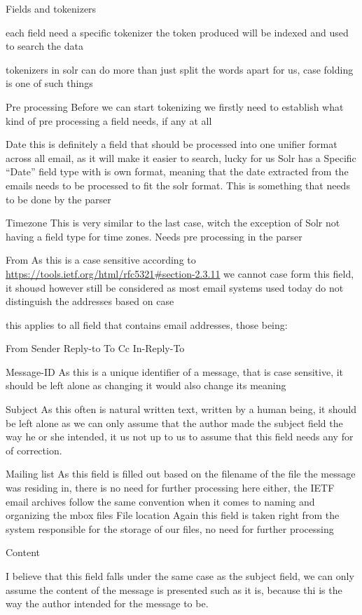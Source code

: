 \documentclass{report}
\begin{document}
Fields and tokenizers

each field need a specific tokenizer
the token produced will be indexed and used to search the data

tokenizers in solr can do more than just split the words apart for us, case folding is one of such things

Pre processing
Before we can start tokenizing we firstly need to establish what kind of pre processing a field needs, if any at all

Date
this is definitely a field that should be processed into one unifier format across all email, as it will make it easier to search, lucky for us Solr has a Specific “Date” field type with is own format, meaning that the date extracted from the emails needs to be processed to fit the solr format. This is something that needs to be done by the parser

Timezone
This is very similar to the last case, witch the exception of Solr not having a field type for time zones. Needs pre processing in the parser

From
As this is a case sensitive according to 
\url{https://tools.ietf.org/html/rfc5321#section-2.3.11}
we cannot case form this field, it shouød however still be considered as most email systems used today do not distinguish the addresses based on case

this applies to all field that contains email addresses, those being:

From
Sender
Reply-to
To
Cc
In-Reply-To

Message-ID
As this is a unique identifier of a message, that is case sensitive, it should be left alone as changing it would also change its meaning


Subject
As this often is natural written text, written by a human being, it should be left alone as we can only assume that the author made the subject field the way he or she intended, it us not up to us to assume that this field needs any for of correction.

Mailing list
As this field is filled out based on the filename of the file the message was residing in, there is no need for further processing here either, the IETF email archives follow the same convention when it comes to naming and organizing the mbox files
File location
Again this field is taken right from the system responsible for the storage of our files, no need for further processing

Content

I believe that this field falls under the same case as the subject field, we can only assume the content of the message is presented such as it is, because thi is the way the author intended for the message to be.
\end{document}
